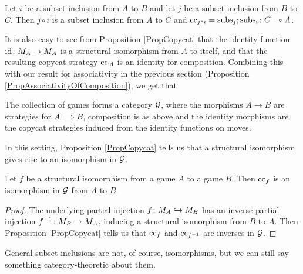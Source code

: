 \begin{corollary}
  Let $i$ be a subset inclusion from $A$ to $B$ and let $j$ be a subset inclusion from $B$ to $C$.  
  Then $j\circ i$ is a subset inclusion from $A$ to $C$ and $\operatorname{cc}_{j\circ i}=\operatorname{subs}_j;\operatorname{subs}_i\colon C \multimap A$.
\end{corollary}

It is also easy to see from Proposition \ref{PropCopycat} that the identity function $\operatorname{id}\colon M_A \to M_A$ is a structural isomorphism from $A$ to itself, and that the resulting copycat strategy $\operatorname{cc}_{\operatorname{id}}$ is an identity for composition.  
Combining this with our result for associativity in the previous section (Proposition \ref{PropAssociativityOfComposition}), we get that
\begin{theorem}
  The collection of games forms a category $\mathcal G$, where the morphisms $A \to B$ are strategies for $A\implies B$, composition is as above and the identity morphisms are the copycat strategies induced from the identity functions on moves.
\end{theorem}

In this setting, Proposition \ref{PropCopycat} tells us that a structural isomorphism gives rise to an isomorphism in $\mathcal G$.
\begin{proposition}
  Let $f$ be a structural isomorphism from a game $A$ to a game $B$.  
  Then $\operatorname{cc}_f$ is an isomorphism in $\mathcal G$ from $A$ to $B$.
\end{proposition}
\begin{proof}
  The underlying partial injection $f\colon M_A \hookrightarrow M_B$ has an inverse partial injection $f^{-1}\colon M_B \to M_A$, inducing a structural isomorphism from $B$ to $A$.  
  Then Proposition \ref{PropCopycat} tells us that $\operatorname{cc}_f$ and $\operatorname{cc}_{f^{-1}}$ are inverses in $\mathcal G$.
\end{proof}

General subset inclusions are not, of course, isomorphisms, but we can still say something category-theoretic about them.

